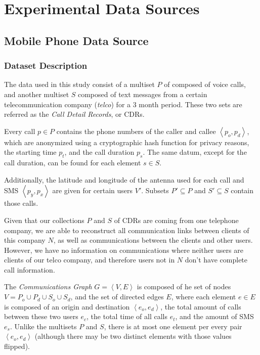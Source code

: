 

\chapter{Experimental Data Sources}
\label{sec:dataset}

\section{Mobile Phone Data Source}
\label{subsec:mobiledatasource}

\subsection{Dataset Description}

The data used in this study consist of a multiset $P$ of composed of voice calls, and another multiset $S$ composed of text messages from a certain telecommunication company (\textit{telco}) for a 3 month period. These two sets are referred as the \emph{Call Detail Records}, or CDRs.

Every call $p \in P$ contains the phone numbers of the caller and callee $\left< p_o, p_d \right>$, which are anonymized using a cryptographic hash function for privacy reasons, the starting time $p_t$, and the call duration $p_s$. The same datum, except for the call duration, can be found for each element $s \in S$.

Additionally, the latitude and longitude of the antenna used for each call and SMS $\left< p_y, p_x \right>$  are given for certain users $V'$. Subsets $P' \subseteq P$ and $S' \subseteq S$ contain those calls.

Given that our collections $P$ and $S$ of CDRs are coming from one telephone company, we are able to reconstruct all communication links between clients of this company $N$, as well as communications between the clients and other users. However, we have no information on communications where neither users are clients of our telco company, and therefore users not in $N$ don't have complete call information.

The \emph{Communications Graph} $G = \left< V, E \right>$ is composed of he set of nodes $V = P_o \cup P_d \cup S_o \cup S_d$, and the set of directed edges $E$, where each element $e \in E$ is composed of an origin and destination $\left< e_o, e_d \right>$, the total amount of calls between these two users $e_c$, the total time of all calls $e_t$, and the amount of SMS $e_s$. Unlike the multisets $P$ and $S$, there is at most one element per every pair $\left< e_o, e_d \right>$ (although there may be two distinct elements with those values flipped).

